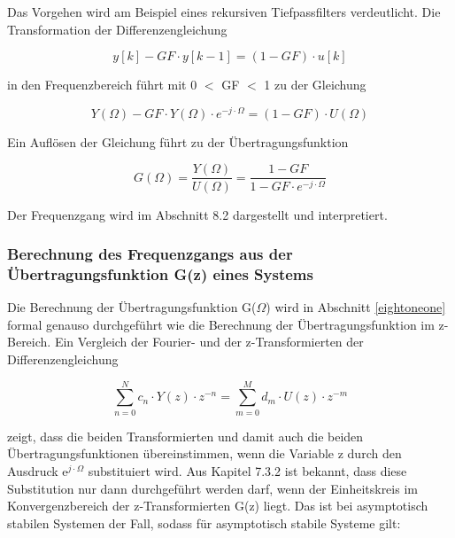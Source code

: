 \noindent Das Vorgehen wird am Beispiel eines rekursiven Tiefpassfilters verdeutlicht. Die Transformation der Differenzengleichung 

\begin{equation}\label{eq:eightfour}
y\left[k\right]-GF\cdot y\left[k-1\right]=\left(1-GF\right)\cdot u\left[k\right]
\end{equation}

\noindent in den Frequenzbereich f\"{u}hrt mit 0 $\mathrm{<}$ GF $\mathrm{<}$ 1 zu der Gleichung

\begin{equation}\label{eq:eightfive}
Y\left(\Omega \right)-GF\cdot Y\left(\Omega \right)\cdot e^{-j\cdot \Omega } =\left(1-GF\right)\cdot U\left(\Omega \right)
\end{equation}

\noindent Ein Aufl\"{o}sen der Gleichung f\"{u}hrt zu der \"{U}bertragungsfunktion 

\begin{equation}\label{eq:eightsix}
G\left(\Omega \right)=\frac{Y\left(\Omega \right)}{U\left(\Omega \right)} =\frac{1-GF}{1-GF\cdot e^{-j\cdot \Omega}}
\end{equation}

\noindent Der Frequenzgang wird im Abschnitt 8.2 dargestellt und interpretiert. 

\subsubsection{Berechnung des Frequenzgangs aus der \"{U}bertragungsfunktion G(z) eines Systems}

\noindent Die Berechnung der \"{U}bertragungsfunktion G($\Omega$) wird in Abschnitt \ref{eightoneone} formal genauso durchgef\"{u}hrt wie die Berechnung der \"{U}bertragungsfunktion im z-Bereich. Ein Vergleich der Fourier- und der z-Transformierten der Differenzengleichung 

\begin{equation}\label{eq:eightseven}
\sum _{n=0}^{N}c_{n} \cdot Y\left(z\right)\cdot z^{-n}  =\sum _{m=0}^{M}d_{m} \cdot U\left(z\right)\cdot z^{-m}
\end{equation}

\noindent zeigt, dass die beiden Transformierten und damit auch die beiden \"{U}bertragungsfunktionen \"{u}bereinstimmen, wenn die Variable z durch den Ausdruck e${}^{j\cdot \Omega}$ substituiert wird. Aus Kapitel 7.3.2 ist bekannt, dass diese Substitution nur dann durchgef\"{u}hrt werden darf, wenn der Einheitskreis im Konvergenzbereich der z-Transformierten G(z) liegt. Das ist bei asymptotisch stabilen Systemen der Fall, sodass f\"{u}r asymptotisch stabile Systeme gilt: 

